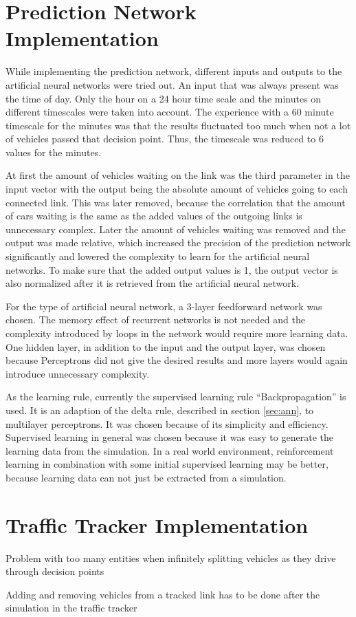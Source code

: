 \section{Prediction Network Implementation}

While implementing the prediction network, different inputs and outputs to the artificial neural networks were tried out. An input that was always present was the time of day. Only the hour on a 24 hour time scale and the minutes on different timescales were taken into account. The experience with a 60 minute timescale for the minutes was that the results fluctuated too much when not a lot of vehicles passed that decision point. Thus, the timescale was reduced to 6 values for the minutes.

At first the amount of vehicles waiting on the link was the third parameter in the input vector with the output being the absolute amount of vehicles going to each connected link. This was later removed, because the correlation that the amount of cars waiting is the same as the added values of the outgoing links is unnecessary complex. Later the amount of vehicles waiting was removed and the output was made relative, which increased the precision of the prediction network significantly and lowered the complexity to learn for the artificial neural networks. To make sure that the added output values is 1, the output vector is also normalized after it is retrieved from the artificial neural network.

For the type of artificial neural network, a 3-layer feedforward network was chosen. The memory effect of recurrent networks is not needed and the complexity introduced by loops in the network would require more learning data. One hidden layer, in addition to the input and the output layer, was chosen because Perceptrons did not give the desired results and more layers would again introduce unnecessary complexity.

As the learning rule, currently the supervised learning rule ``Backpropagation'' is used. It is an adaption of the delta rule, described in section \ref{sec:ann}, to multilayer perceptrons. It was chosen because of its simplicity and efficiency. Supervised learning in general was chosen because it was easy to generate the learning data from the simulation. In a real world environment, reinforcement learning in combination with some initial supervised learning may be better, because learning data can not just be extracted from a simulation.

\section{Traffic Tracker Implementation}

Problem with too many entities when infinitely splitting vehicles as they drive through decision points

Adding and removing vehicles from a tracked link has to be done after the simulation in the traffic tracker